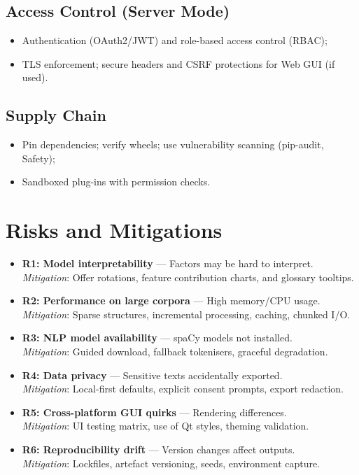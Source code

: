 \subsection{Access Control (Server Mode)}
\begin{itemize}
    \item Authentication (OAuth2/JWT) and role-based access control (RBAC);
    \item TLS enforcement; secure headers and CSRF protections for Web GUI (if used).
\end{itemize}

\subsection{Supply Chain}
\begin{itemize}
    \item Pin dependencies; verify wheels; use vulnerability scanning (pip-audit, Safety);
    \item Sandboxed plug-ins with permission checks.
\end{itemize}

\section{Risks and Mitigations}
\begin{itemize}
    \item \textbf{R1: Model interpretability} — Factors may be hard to interpret. \\
          \emph{Mitigation}: Offer rotations, feature contribution charts, and glossary tooltips.
    \item \textbf{R2: Performance on large corpora} — High memory/CPU usage. \\
          \emph{Mitigation}: Sparse structures, incremental processing, caching, chunked I/O.
    \item \textbf{R3: NLP model availability} — spaCy models not installed. \\
          \emph{Mitigation}: Guided download, fallback tokenisers, graceful degradation.
    \item \textbf{R4: Data privacy} — Sensitive texts accidentally exported. \\
          \emph{Mitigation}: Local-first defaults, explicit consent prompts, export redaction.
    \item \textbf{R5: Cross-platform GUI quirks} — Rendering differences. \\
          \emph{Mitigation}: UI testing matrix, use of Qt styles, theming validation.
    \item \textbf{R6: Reproducibility drift} — Version changes affect outputs. \\
          \emph{Mitigation}: Lockfiles, artefact versioning, seeds, environment capture.
\end{itemize}

